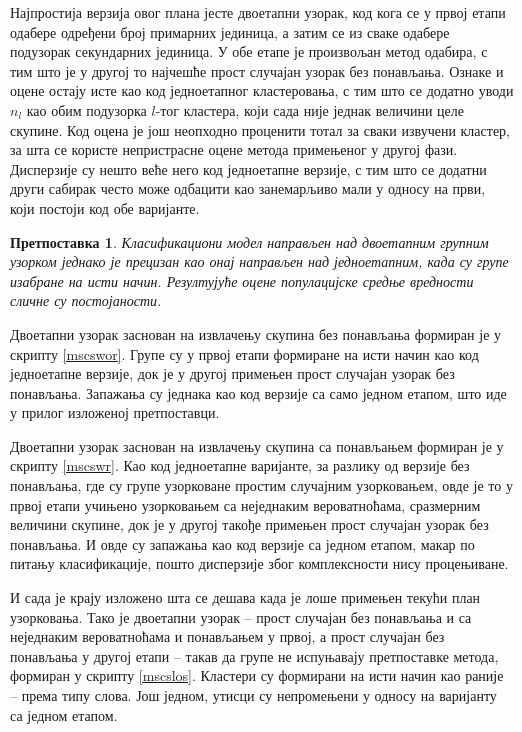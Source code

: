 \documentclass[a4paper]{article}
\newtheorem{hipoteza}{Претпоставка}
\begin{document}
Најпростија верзија овог плана јесте двоетапни узорак, код кога се у првој етапи одабере одређени број примарних јединица, а затим се из сваке одабере подузорак секундарних јединица. У обе етапе је произвољан метод одабира, с тим што је у другој то најчешће прост случајан узорак без понављања. Ознаке и оцене остају исте као код једноетапног кластеровања, с тим што се додатно уводи $n_l$ као обим подузорка $l$-тог кластера, који сада није једнак величини целе скупине. Код оцена је још неопходно проценити тотал за сваки извучени кластер, за шта се користе непристрасне оцене метода примењеног у другој фази. Дисперзије су нешто веће него код једноетапне верзије, с тим што се додатни други сабирак често може одбацити као занемарљиво мали у односу на први, који постоји код обе варијанте.

\begin{hipoteza}
Класификациони модел направљен над двоетапним групним узорком једнако је прецизан као онај направљен над једноетапним, када су групе изабране на исти начин. Резултујуће оцене популацијске средње вредности сличне су постојаности.
\end{hipoteza}

Двоетапни узорак заснован на извлачењу скупина без понављања формиран је у скрипту \ref{mscswor}. Групе су у првој етапи формиране на исти начин као код једноетапне верзије, док је у другој примењен прост случајан узорак без понављања. Запажања су једнака као код верзије са само једном етапом, што иде у прилог изложеној претпоставци.



Двоетапни узорак заснован на извлачењу скупина са понављањем формиран је у скрипту \ref{mscswr}. Као код једноетапне варијанте, за разлику од верзије без понављања, где су групе узорковане простим случајним узорковањем, овде је то у првој етапи учињено узорковањем са неједнаким вероватноћама, сразмерним величини скупине, док је у другој такође примењен прост случајан узорак без понављања. И овде су запажања као код верзије са једном етапом, макар по питању класификације, пошто дисперзије због комплексности нису процењиване.



И сада је крају изложено шта се дешава када је лоше примењен текући план узорковања. Тако је двоетапни узорак -- прост случајан без понављања и са неједнаким вероватноћама и понављањем у првој, а прост случајан без понављања у другој етапи -- такав да групе не испуњавају претпоставке метода, формиран у скрипту \ref{mscslos}. Кластери су формирани на исти начин као раније -- према типу слова. Још једном, утисци су непромењени у односу на варијанту са једном етапом.
\end{document}
